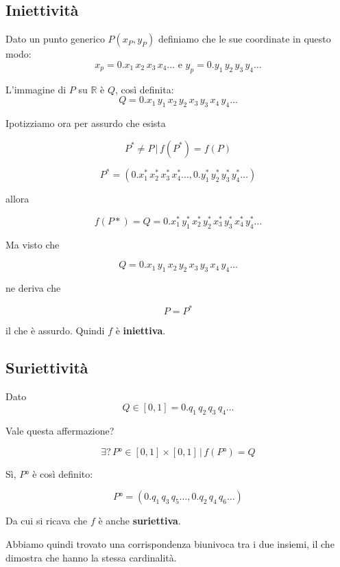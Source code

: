 \documentclass[../dimostrazioni]{subfiles}
\begin{document}
            \subsection*{Iniettività}

                Dato un punto generico \(P (x_P,y_P) \) definiamo che le sue coordinate in questo modo:
                \[  x_p = 0.x_1 \, x_2 \, x_3 \, x_4 \dots \, \, \text{e} \, \, y_p = 0.y_1 \, y_2 \, y_3 \, y_ 4 \dots \]

                L'immagine di \(P\) su \( \mathbb{R} \) è \( Q \), così definita:
                \[   Q = 0.x_1 \, y_1 \, x_2 \, y_2 \, x_3 \, y_3 \, x_4 \, y_ 4 \dots    \]

                Ipotizziamo ora per assurdo che esista 

                \[    P^* \neq P \, | \, f(P^*) = f(P) \]

                \[    P^* = (0.x^*_1 \, x^*_2 \, x^*_3 \, x^*_4 \dots , 0.y^*_1 \, y^*_2 \, y^*_3 \, y^*_4 \dots) \]

                allora

                \[    f(P*) = Q = 0.x^*_1 \, y^*_1 \, x^*_2 \, y^*_2 \, x^*_3 \, y^*_3 \, x^*_4 \, y^*_4 \dots \]

                Ma visto che

                \[ Q = 0.x_1 \, y_1 \, x_2 \, y_2 \, x_3 \, y_3 \, x_4 \, y_ 4 \dots \]

                ne deriva che

                \[P = P^*\]

                il che è assurdo. Quindi \(f\) è \textbf{iniettiva}.

            \subsection*{Suriettività}

                Dato
                \[    Q \in [0,1] = 0.q_1 \, q_2 \, q_3 \, q_4 \dots    \]

                Vale questa affermazione?

                \[    \exists \text{?} \, P° \in [0,1] \times [0,1] \, | \, f(P°) = Q    \]

                Sì, \(P°\) è così definito:

                \[    P° = (0.q_1 \, q_3 \, q_5 \dots, 0.q_2 \, q_4 \, q_6 \dots)    \]

                Da cui si ricava che \(f\) è anche \textbf{suriettiva}.

                \bigskip

                Abbiamo quindi trovato una corrispondenza biunivoca tra i due insiemi, il che dimostra che hanno la stessa cardinalità.
            
\end{document}
